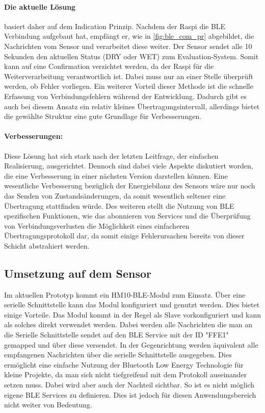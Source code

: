 \paragraph{Die aktuelle Lösung} basiert daher auf dem Indication Prinzip. Nachdem der Raspi die BLE Verbindung aufgebaut hat, empfängt er, wie in \ref{fig:ble_com_pr} abgebildet, die Nachrichten vom Sensor und verarbeitet diese weiter. Der Sensor sendet alle 10 Sekunden den aktuellen Status (\glqq{}DRY\grqq{} oder \glqq{}WET\grqq{}) zum Evaluation-System. Somit kann auf eine Confirmation verzichtet werden, da der Raspi für die Weiterverarbeitung verantwortlich ist. Dabei muss nur an einer Stelle überprüft werden, ob Fehler vorliegen. Ein weiterer Vorteil dieser Methode ist die schnelle Erfassung von Verbindungsfehlern während der Entwicklung. Dadurch gibt es auch bei diesem Ansatz ein relativ kleines Übertragungsintervall, allerdings bietet die gewählte Struktur eine gute Grundlage für Verbesserungen.

\paragraph{Verbesserungen:} Diese Lösung hat sich stark nach der letzten Leitfrage, der einfachen Realisierung, ausgerichtet. Dennoch sind dabei viele Aspekte diskutiert worden, die eine Verbesserung in einer nächsten Version darstellen können. Eine wesentliche Verbesserung bezüglich der Energiebilanz des Sensors wäre nur noch das Senden von Zustandsänderungen, da somit wesentlich seltener eine Übertragung stattfinden würde. Des weiteren stellt die Nutzung von BLE spezifischen Funktionen, wie das abonnieren von Services und die Überprüfung von Verbindungsverlusten die Möglichkeit eines einfacheren Übertragungsprotokoll dar, da somit einige Fehlerursachen bereits von dieser Schicht abstrahiert werden.

\subsection{Umsetzung auf dem Sensor}
Im aktuellen Prototyp kommt ein HM10-BLE-Modul zum Einsatz. Über eine serielle Schnittstelle kann das Modul konfiguriert und genutzt werden. Dies bietet einige Vorteile. Das Modul kommt in der Regel als Slave vorkonfiguriert und kann als solches direkt verwendet werden. Dabei werden alle Nachrichten die man an die Serielle Schnittstelle sendet auf den BLE Service mit der ID "FFE1" gemapped und über diese versendet. In der Gegenrichtung werden äquivalent alle empfangenen Nachrichten über die serielle Schnittstelle ausgegeben. Dies ermöglicht eine einfache Nutzung der Bluetooth Low Energy Technologie für kleine Projekte, da man sich nicht tiefgreifend mit dem Protokoll auseinander setzen muss. Dabei wird aber auch der Nachteil sichtbar. So ist es nicht möglich eigene BLE Services zu definieren. Dies ist jedoch für diesen Anwendungsbereich nicht weiter von Bedeutung. 

